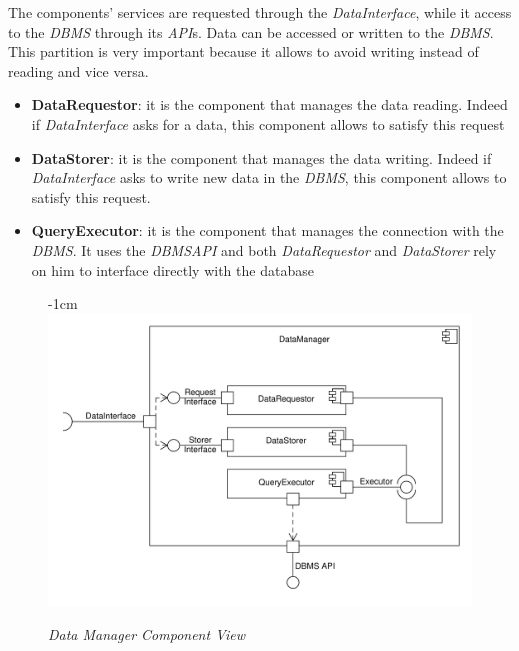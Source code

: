 \documentclass{article}
\begin{document}
				The components’ services are requested through the \emph{DataInterface}, while it access to the \emph{DBMS} through its \emph{API}s. Data can be accessed or written to the \emph{DBMS}. This partition is very important because it allows to avoid writing instead of reading and vice versa.
				
				\begin{itemize}
					\item {\bfseries DataRequestor}: it is the component that manages the data reading. Indeed if \emph{DataInterface} asks for a data, this component allows to satisfy this request
					
					\item {\bfseries DataStorer}: it is the component that manages the data writing. Indeed if \emph{DataInterface} asks to write new data in the \emph{DBMS}, this component allows to satisfy this request.
					
					\item {\bfseries QueryExecutor}: it is the component that manages the connection with the \emph{DBMS}. It uses the \emph{DBMSAPI} and both \emph{DataRequestor} and \emph{DataStorer} rely on him to interface directly with the database
				\end{itemize}
			
				\begin{figure}
					\begin{adjustwidth} {-1cm}{}
						\centering
						\includegraphics[scale=0.5]{Component Diagrams/DataManagerComponentView.pdf}\\
					\end{adjustwidth}
					\caption{\emph{Data Manager Component View}}
				\end{figure}
			
\end{document}
